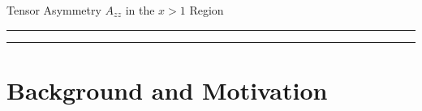 \documentclass[12pt]{article}
\begin{document}
\pagestyle{empty}
 
\begin{center}
 \LARGE{
  Tensor Asymmetry $A_{zz}$ in the $x>1$ Region
 }
\end{center}
%
\hrule \vspace{.05cm}\hrule
%


\newpage

\begin{abstract}
  
\end{abstract}

\newpage


%


\clearpage


\tableofcontents


\pagestyle{plain}

\clearpage

%

\section{Background and Motivation}


%

% 
% 



\label{PREDB1X}
%   
\end{document}
